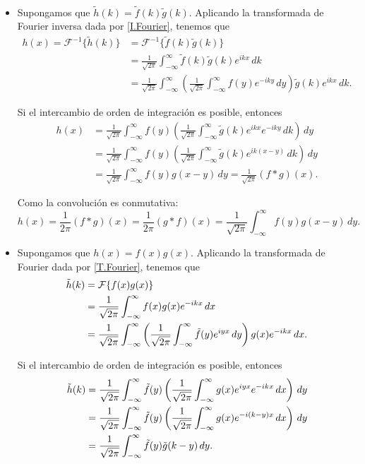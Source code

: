\begin{demo}
\ 

\begin{itemize}
    \item Supongamos que  $\tilde{h}(k) = \tilde{f}(k) \tilde{g}(k)$. Aplicando la transformada de Fourier inversa dada por \eqref{I.Fourier}, tenemos que 
\begin{align*}
   h(x) = \mathcal{F}^{-1} \{\tilde{h}(k)\} & = \mathcal{F}^{-1} \{\tilde{f}(k) \tilde{g}(k)\} \\
   & = \frac{1}{\sqrt{2\pi}} \int_{-\infty}^{\infty} \tilde{f}(k) \tilde{g}(k) e^{ikx} \,dk \\
   & = \frac{1}{\sqrt{2\pi}} \int_{-\infty}^{\infty}  \left( \frac{1}{\sqrt{2\pi}} \int_{-\infty}^{\infty} f(y) e^{-ik y} \,dy \right) \tilde{g}(k)  e^{ikx}  \,dk.
\end{align*}

Si el intercambio de orden de integración es posible, entonces 
\begin{align*}
  h(x) &= \frac{1}{\sqrt{2\pi}} \int_{-\infty}^{\infty}  f(y)  \left( \frac{1}{\sqrt{2\pi}} \int_{-\infty}^{\infty}  \tilde{g}(k)  e^{ikx} e^{-ik y}\,d k \right) \,dy \\
   & = \frac{1}{\sqrt{2\pi}} \int_{-\infty}^{\infty}  f(y)  \left( \frac{1}{\sqrt{2\pi}} \int_{-\infty}^{\infty}  \tilde{g}(k)  e^{ik(x-y)}\,d k \right) \,dy \\
   & = \frac{1}{\sqrt{2\pi}} \int_{-\infty}^{\infty}  f(y) g(x-y) \,dy = \frac{1}{\sqrt{2\pi}} (f * g)(x).
\end{align*}

Como la convolución es conmutativa:
$$h(x) = \frac{1}{2\pi} (f * g)(x) = \frac{1}{2\pi} (g * f)(x)  = \frac{1}{\sqrt{2\pi}} \int_{-\infty}^{\infty}  f(y) g(x-y) \,dy.$$

\item  Supongamos que $h(x) = f(x) g(x)$. Aplicando la transformada de Fourier dada por \eqref{T.Fourier}, tenemos que 
\begin{align*}
   \Tilde{h}(k) &=  \mathcal{F} \{f(x) g(x)\} \\
   &= \frac{1}{\sqrt{2\pi}} \int_{-\infty}^{\infty} f(x) g(x) e^{-ikx} \,dx \\
   &=  \frac{1}{\sqrt{2\pi}} \int_{-\infty}^{\infty} \left( \frac{1}{\sqrt{2\pi}} \int_{-\infty}^{\infty} \Tilde{f}(y) e^{iyx} \,dy \right) g(x) e^{-ikx} \,dx.
\end{align*}

Si el intercambio de orden de integración es posible, entonces 
\begin{align*}
   \Tilde{h}(k) &=  \frac{1}{\sqrt{2\pi}} \int_{-\infty}^{\infty} \Tilde{f}(y) \left( \frac{1}{\sqrt{2\pi}} \int_{-\infty}^{\infty} g(x) e^{iyx}  e^{-ikx}\,dx \right) \,dy \\
   &=  \frac{1}{\sqrt{2\pi}} \int_{-\infty}^{\infty} \Tilde{f}(y) \left( \frac{1}{\sqrt{2\pi}} \int_{-\infty}^{\infty} g(x) e^{-i(k-y)x} \,dx \right) \,dy \\
   &=  \frac{1}{\sqrt{2\pi}} \int_{-\infty}^{\infty} \Tilde{f}(y) \Tilde{g}(k-y) \,dy. 
\end{align*}


\end{itemize}
\end{demo}
